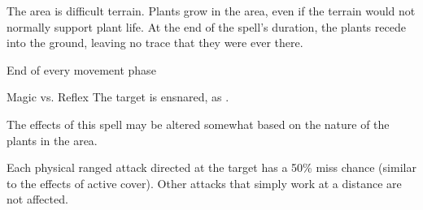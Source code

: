 \begin{spellheader}
    \spelldur{\durshort \dismissable}
\end{spellheader}
\begin{spelleffects}
    \spelleffect The area is difficult terrain. Plants grow in the area, even if the terrain would not normally support plant life. At the end of the spell's duration, the plants recede into the ground, leaving no trace that they were ever there.
    \begin{spelltrigger}{End of every movement phase}
        \begin{spellattack}{Magic vs. Reflex}
            \spellsuccess The target is ensnared, as .
        \end{spellattack}
    \end{spelltrigger}
\end{spelleffects}
\begin{spellfooter}
    \spellnotes The effects of this spell may be altered somewhat based on the nature of the plants in the area.
\end{spellfooter}

\begin{spellheader}
    \spelldur{\durshort \dismissable}
\end{spellheader}
\begin{spelleffects}
    \spelleffect Each physical ranged attack directed at the target has a 50\% miss chance (similar to the effects of active cover). Other attacks that simply work at a distance are not affected.
\end{spelleffects}
\begin{spellfooter}

\end{spellfooter}

